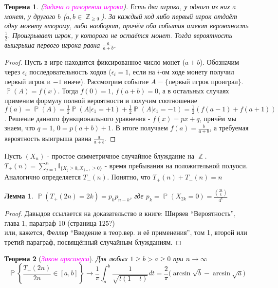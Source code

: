 \documentclass[a4paper,100pt]{article}
\theoremstyle{indented}
\newtheorem{theorem}{Теорема}
\newtheorem{lemma}{Лемма}
\theoremstyle{definition}
\theoremstyle{remark}
\DeclareMathOperator{\ZZ}{\mathbb{Z}}
\DeclareMathOperator{\PP}{\mathbb{P}}
\begin{document}
\begin{theorem}
  (\hypertarget{n44}{\textcolor{magenta}{\textit{Задача о разорении игрока}}}). Есть два игрока, у одного из них $a$ монет, у другого $b$ ($a, b \in \ZZ_{\geq 0}$). За каждый ход либо первый игрок отдаёт одну моенту второму, либо наоборот, причём оба события имеют вероятность $\frac{1}{2}$. Проигрывает игрок, у которого не остаётся монет. Тогда вероятность выигрыша первого игрока равна $\frac{a}{a+b}$.
\end{theorem}

\begin{proof}
  Пусть в игре находится фиксированное число монет ($a+b$). Обозначим через $\epsilon_i$ последовательность ходов ($\epsilon_i=1$, если на $i$-ом ходе монету получил первый игрок и $-1$ иначе). Рассмотрим событие $A=\{\text{первый игрок проиграл}\}$. $\PP(A)=f(x)$. Тогда $f(0)=1$, $f(a+b)=0$, а в остальных случаях применим формулу полной вероятности и получим соотношение $f(a)=\PP(A)=\frac{1}{2}\PP(A | \epsilon_1=+1)+\frac{1}{2}\PP(A | \epsilon_1=-1)=\frac{1}{2}(f(a-1)+f(a+1))$. Решение данного функционального уравнения - $f(x)=px+q$, причём мы знаем, что $q=1$, $0=p(a+b)+1$. В итоге получаем $f(a)=\frac{b}{a+b}$, а требуемая вероятность выигрыша равна $\frac{a}{a+b}$.
\end{proof}

Пусть $(X_n)$ - простое симметричное случайное блуждание на $\ZZ$. $T_+(n)=\sum_{j=1}^n \mathbb{I}_{\{X_j \geq 0, X_{j-1} \geq 0\}}$ - время пребывания на положительной полуоси. Аналогично определяется $T_-(n)$. Понятно, что $T_+(n)+T_-(n)=n$ 

\begin{lemma}
  $\PP(T_+(2n)=2k)=p_kp_{n-k}$, где $p_k=\PP(X_{2k}=0)=\frac{{2k\choose k}}{4^k}$
\end{lemma}

\begin{proof}
  Давыдов ссылается на доказательство в книге:
  Ширяев ``Вероятность'', глава 1, параграф 10 (страница 125?)\\
  или, кажется, 
  Феллер ``Введение в теор.вер. и её применения'', том 1, второй или третий параграф, посвящённый случайным блужданиям.
\end{proof}

\begin{theorem}[\hypertarget{n46}{\textcolor{magenta}{\textit{Закон арксинуса}}}]
  Для любых $1\geq b>a\geq 0$ при $n \rightarrow \infty$ 
  \begin{equation*}
    \PP\left\{\frac{T_+(2n)}{2n} \in [a, b]\right\} \rightarrow \frac{1}{\pi} \int_{a}^b \frac{1}{\sqrt{t(1-t)}} dt=\frac{2}{\pi} \Big ( \arcsin{\sqrt{b}} - \arcsin{\sqrt{a}} \Big )
  \end{equation*}
\end{theorem}
\end{document}
